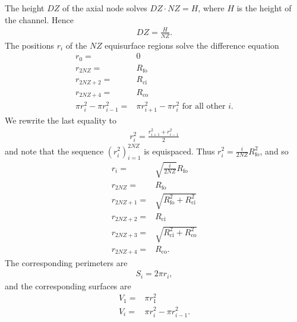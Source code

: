 \documentclass[english, a4paper, 12pt]{article}
\begin{document}
The height $DZ$ of the axial node solves $DZ \cdot NZ = H$, where $H$ is the height of the channel.
Hence
\begin{align}
	DZ = \frac{H}{NZ}.
\end{align}
The positions $r_{i}$ of the $NZ$ equisurface regions solve the difference equation
\begin{align}
	r_{0} ={}& 0\\
	r_{2 NZ} ={}& R_{\textrm{fo}}\\
	r_{2 NZ + 2} ={}& R_{\textrm{ci}}\\
	r_{2 NZ + 4} ={}& R_{\textrm{co}}\\
	\pi r_{i}^2 - \pi r_{i - 1}^{2} ={}& \pi r_{i + 1}^2 - \pi r_{i}^{2} \textrm{ for all other $i$}.
\end{align}
We rewrite the last equality to
\begin{align}
	r_{i}^2 = \frac{r_{i + 1}^2 + r_{i - 1}^{2}}{2}
\end{align}
and note that the sequence $(r_{i}^{2})_{i = 1}^{2 NZ}$ is equispaced.
Thus $r_{i}^{2} = \frac{i}{2 NZ} R_{\textrm{fo}}^{2}$, and so
\begin{align}
	r_{i} ={}& \sqrt{\frac{i}{2 NZ}} R_{\textrm{fo}}\\
	r_{2 NZ} ={}& R_{\textrm{fo}}\\
	r_{2 NZ + 1} ={}& \sqrt{R_{\textrm{fo}}^{2} + R_{\textrm{ci}}^{2}}\\
	r_{2 NZ + 2} ={}& R_{\textrm{ci}}\\
	r_{2 NZ + 3} ={}& \sqrt{R_{\textrm{ci}}^{2} + R_{\textrm{co}}^{2}}\\
	r_{2 NZ + 4} ={}& R_{\textrm{co}}.
\end{align}
The corresponding perimeters are
\begin{align}
	S_{i} = 2 \pi r_{i},
\end{align}
and the corresponding surfaces are
\begin{align}
	V_{1} ={}& \pi r_{1}^{2}\\
	V_{i} ={}& \pi r_{i}^{2} - \pi r_{i - 1}^{2}.
\end{align}
\end{document}
